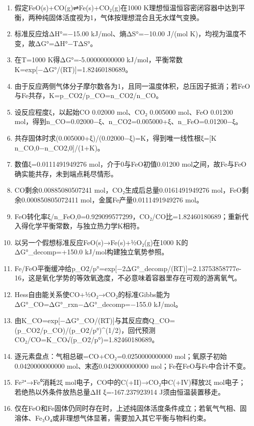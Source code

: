 \documentclass[UTF8,11pt,a4paper]{ctexart}
\begin{document}
\begin{enumerate}
\item 假定FeO(s)+CO(g)⇌Fe(s)+CO₂(g)在1000 K理想恒温恒容密闭容器中达到平衡，两种纯固体活度视为1，气体按理想混合且无水煤气变换。
\item 标准反应焓ΔH°=−15.00 kJ/mol、熵ΔS°=−10.00 J/(mol K)，均视为温度不变，故ΔG°=ΔH°−TΔS°。
\item 在T=1000 K得ΔG°=-5.00000000000 kJ/mol，平衡常数K=exp[−ΔG°/(RT)]=1.82460180689。
\item 由于反应两侧气体分子摩尔数各为1，且同一温度体积，总压因子抵消；若FeO与Fe共存，K=p\_CO2/p\_CO=n\_CO2/n\_CO。
\item 设反应程度ξ，以起始CO 0.02000 mol、CO₂ 0.005000 mol、FeO 0.01200 mol，得到n\_CO=0.02000−ξ、n\_CO2=0.005000+ξ、n\_FeO=0.01200−ξ。
\item 共存固体时求(0.005000+ξ)/(0.02000−ξ)=K，得到唯一线性根ξ=[K n\_CO,0−n\_CO2,0]/(1+K)。
\item 数值ξ=0.0111491949276 mol，介于0与FeO初值0.01200 mol之间，故Fe与FeO确实能共存，未到端点耗尽情形。
\item CO剩余0.00885080507241 mol，CO₂生成后总量0.0161491949276 mol，FeO剩余0.000850805072411 mol，金属Fe产量0.0111491949276 mol。
\item FeO转化率ξ/n\_FeO,0=0.929099577299，CO₂/CO比=1.82460180689；重新代入得化学平衡常数，与独立热力学K相符。
\item 以另一个假想标准反应FeO(s)→Fe(s)+½O₂(g)在1000 K的ΔG°\_decomp=+150.0 kJ/mol构建独立氧势参照。
\item Fe/FeO平衡缓冲给p\_O2/p°=exp[−2ΔG°\_decomp/(RT)]=2.13753858777e-16，这是氧化学势的等效氧逸度，不必意味着容器里存在可观的游离氧气。
\item Hess自由能关系使CO+½O₂→CO₂的标准Gibbs能为ΔG°\_CO=ΔG°\_rxn−ΔG°\_decomp=−155.0 kJ/mol。
\item 由K\_CO=exp[−ΔG°\_CO/(RT)]与其反应商Q\_CO=(p\_CO2/p\_CO)/(p\_O2/p°)\textasciicircum{}(1/2)，回代预测CO₂/CO=K\_CO√(p\_O2/p°)=1.82460180689。
\item 逐元素盘点：气相总碳=CO+CO₂=0.0250000000000 mol；氧原子初始0.0420000000000 mol、末态0.0420000000000 mol；Fe在FeO与Fe中合计不变。
\item Fe²⁺→Fe⁰消耗2ξ mol电子，CO中的C(+II)→CO₂中C(+IV)释放2ξ mol电子；若绝热以外条件放热总量ΔH ξ=-167.237923914 J须由恒温装置移走。
\item 仅在FeO和Fe固体仍同时存在时，上述纯固体活度条件成立；若氧气气相、固溶体、Fe₃O₄或非理想气体显著，需要加入其它平衡与物料约束。
\end{enumerate}
\end{document}

